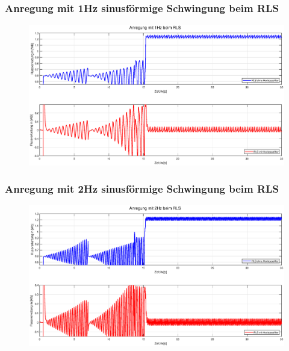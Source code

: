\documentclass[serif,11pt, xcolor=table]{beamer}
\begin{document}
	\begin{frame}
		\frametitle{Anregung mit 1Hz sinusförmige Schwingung beim RLS}
	
		\begin{figure}[htbp]
			\centering
			\includegraphics[scale=0.30]{Abbildungen/RLS_1.eps}
			
		\end{figure}	
		
	\end{frame}
	\begin{frame}
		\frametitle{Anregung mit 2Hz sinusförmige Schwingung beim RLS}
		
		\begin{figure}[htbp]
			\centering
			\includegraphics[scale=0.30]{Abbildungen/RLS_2.eps}
			
		\end{figure}	
		
	\end{frame}
\end{document}
